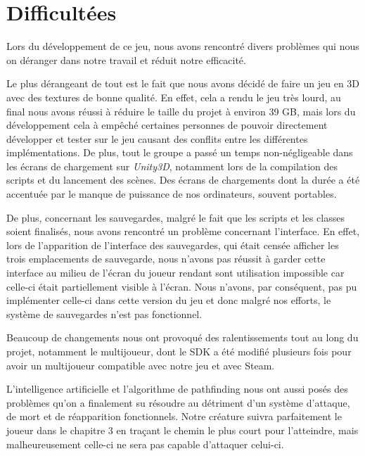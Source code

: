 \section{Difficultées}
\setlength{\parindent}{5ex}
Lors du développement de ce jeu, nous avons rencontré divers problèmes qui nous on déranger dans notre travail et réduit notre efficacité.

\par
Le plus dérangeant de tout est le fait que nous avons décidé de faire un jeu en 3D avec des textures de bonne qualité. En effet, cela a rendu le jeu très lourd, au final nous avons réussi à réduire le taille du projet à environ 39 GB, mais lors du développement cela à empêché certaines personnes de pouvoir directement développer et tester sur le jeu causant des conflits entre les différentes implémentations. De plus, tout le groupe a passé un temps non-négligeable dans les écrans de chargement sur \emph{Unity3D}, notamment lors de la compilation des scripts et du lancement des scènes. Des écrans de chargements dont la durée a été accentuée par le manque de puissance de nos ordinateurs, souvent portables.

\vspace*{7mm}
\par
De plus, concernant les sauvegardes, malgré le fait que les scripts et les classes soient finalisés, nous avons rencontré un problème concernant l'interface. En effet, lors de l'apparition de l'interface des sauvegardes, qui était censée afficher les trois emplacements de sauvegarde, nous n'avons pas réussit à garder cette interface au milieu de l'écran du joueur rendant sont utilisation impossible car celle-ci était partiellement visible à l'écran.
Nous n'avons, par conséquent, pas pu implémenter celle-ci dans cette version du jeu et donc malgré nos efforts, le système de sauvegardes n'est pas fonctionnel.

\vspace*{7mm}
\par
Beaucoup de changements nous ont provoqué des ralentissements tout au long du projet, notamment le multijoueur, dont le SDK a été modifié plusieurs fois pour avoir un multijoueur compatible avec notre jeu et avec Steam.

\vspace*{7mm}
\par
L'intelligence artificielle et l'algorithme de pathfinding nous ont aussi posés des problèmes qu'on a finalement su résoudre au détriment d'un système d'attaque, de mort et de réapparition fonctionnels. Notre créature suivra parfaitement le joueur dans le chapitre 3 en traçant le chemin le plus court pour l'atteindre, mais malheureusement celle-ci ne sera pas capable d'attaquer celui-ci.



